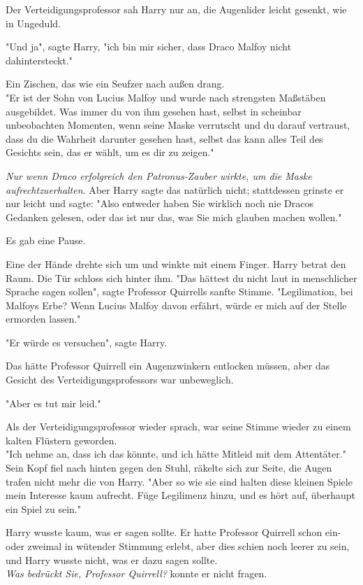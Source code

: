 {Der Verteidigungsprofessor sah Harry nur an, die Augenlider leicht gesenkt, wie in Ungeduld.

"Und ja", sagte Harry, "ich bin mir sicher, dass Draco Malfoy nicht dahintersteckt."

Ein Zischen, das wie ein Seufzer nach außen drang.\\ "Er ist der Sohn von Lucius Malfoy und wurde nach strengsten Maßstäben ausgebildet. Was immer du von ihm gesehen hast, selbst in scheinbar unbeobachten Momenten, wenn seine Maske verrutscht und du darauf vertraust, dass du die Wahrheit darunter gesehen hast, selbst das kann alles Teil des Gesichts sein, das er wählt, um es dir zu zeigen."

\emph{Nur wenn Draco erfolgreich den Patronus-Zauber wirkte, um die Maske aufrechtzuerhalten}. Aber Harry sagte das natürlich nicht; stattdessen grinste er nur leicht und sagte: "Also entweder haben Sie wirklich noch nie Dracos Gedanken gelesen, oder das ist nur das, was Sie mich glauben machen wollen."

Es gab eine Pause.

Eine der Hände drehte sich um und winkte mit einem Finger. Harry betrat den Raum. Die Tür schloss sich hinter ihm. "Das hättest du nicht laut in menschlicher Sprache sagen sollen", sagte Professor Quirrells sanfte Stimme. "Legilimation, bei Malfoys Erbe? Wenn Lucius Malfoy davon erfährt, würde er mich auf der Stelle ermorden lassen."

"Er würde es versuchen", sagte Harry.

Das hätte Professor Quirrell ein Augenzwinkern entlocken müssen, aber das Gesicht des Verteidigungsprofessors war unbeweglich.

"Aber es tut mir leid."

Als der Verteidigungsprofessor wieder sprach, war seine Stimme wieder zu einem kalten Flüstern geworden.\\ "Ich nehme an, dass ich das könnte, und ich hätte Mitleid mit dem Attentäter." Sein Kopf fiel nach hinten gegen den Stuhl, räkelte sich zur Seite, die Augen trafen nicht mehr die von Harry. "Aber so wie sie sind halten diese kleinen Spiele mein Interesse kaum aufrecht. Füge Legilimenz hinzu, und es hört auf, überhaupt ein Spiel zu sein."

Harry wusste kaum, was er sagen sollte. Er hatte Professor Quirrell schon ein- oder zweimal in wütender Stimmung erlebt, aber dies schien noch leerer zu sein, und Harry wusste nicht, was er dazu sagen sollte.\\ \emph{Was bedrückt Sie, Professor Quirrell?} konnte er nicht fragen.

}
